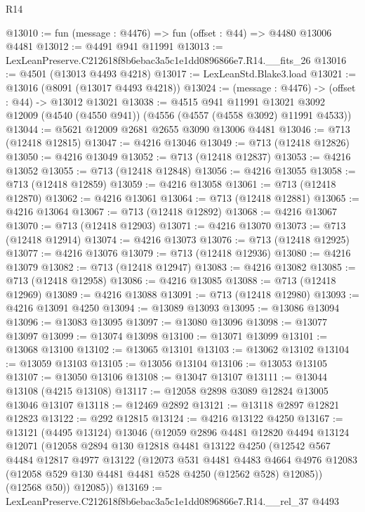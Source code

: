 \begin{lexlean}{R14}
\begin{coremodule}
@13010 := fun (message : @4476) => fun (offset : @44) => @4480 @13006 @4481
@13012 := @4491 @941 @11991
@13013 := LexLeanPreserve.C212618f8b6ebac3a5c1e1dd0896866e7.R14.__fits_26
@13016 := @4501 (@13013 @4493 @4218)
@13017 := LexLeanStd.Blake3.load
@13021 := @13016 (@8091 (@13017 @4493 @4218))
@13024 := (message : @4476) -> (offset : @44) -> @13012 @13021
@13038 := @4515
    @941
    @11991
    @13021
    @3092
    @12009
    (@4540 (@4550 @941))
    (@4556 (@4557 (@4558 @3092) @11991 @4533))
@13044 := @5621 @12009 @2681 @2655 @3090 @13006 @4481
@13046 := @713 (@12418 @12815)
@13047 := @4216 @13046
@13049 := @713 (@12418 @12826)
@13050 := @4216 @13049
@13052 := @713 (@12418 @12837)
@13053 := @4216 @13052
@13055 := @713 (@12418 @12848)
@13056 := @4216 @13055
@13058 := @713 (@12418 @12859)
@13059 := @4216 @13058
@13061 := @713 (@12418 @12870)
@13062 := @4216 @13061
@13064 := @713 (@12418 @12881)
@13065 := @4216 @13064
@13067 := @713 (@12418 @12892)
@13068 := @4216 @13067
@13070 := @713 (@12418 @12903)
@13071 := @4216 @13070
@13073 := @713 (@12418 @12914)
@13074 := @4216 @13073
@13076 := @713 (@12418 @12925)
@13077 := @4216 @13076
@13079 := @713 (@12418 @12936)
@13080 := @4216 @13079
@13082 := @713 (@12418 @12947)
@13083 := @4216 @13082
@13085 := @713 (@12418 @12958)
@13086 := @4216 @13085
@13088 := @713 (@12418 @12969)
@13089 := @4216 @13088
@13091 := @713 (@12418 @12980)
@13093 := @4216 @13091 @4250
@13094 := @13089 @13093
@13095 := @13086 @13094
@13096 := @13083 @13095
@13097 := @13080 @13096
@13098 := @13077 @13097
@13099 := @13074 @13098
@13100 := @13071 @13099
@13101 := @13068 @13100
@13102 := @13065 @13101
@13103 := @13062 @13102
@13104 := @13059 @13103
@13105 := @13056 @13104
@13106 := @13053 @13105
@13107 := @13050 @13106
@13108 := @13047 @13107
@13111 := @13044 @13108 (@4215 @13108)
@13117 := @12058 @2898 @3089 @12824 @13005 @13046 @13107
@13118 := @12469 @2892
@13121 := @13118 @2897 @12821 @12823
@13122 := @292 @12815
@13124 := @4216 @13122 @4250
@13167 := @13121
    (@4495 @13124)
    @13046
    (@12059
      @2896
      @4481
      @12820
      @4494
      @13124
      @12071
      (@12058
        @2894
        @130
        @12818
        @4481
        @13122
        @4250
        (@12542
          @567
          @4484
          @12817
          @4977
          @13122
          (@12073
            @531
            @4481
            @4483
            @4664
            @4976
            @12083
            (@12058 @529 @130 @4481 @4481 @528 @4250 (@12562 @528) @12085))
          (@12568 @50))
        @12085))
@13169 := LexLeanPreserve.C212618f8b6ebac3a5c1e1dd0896866e7.R14.__rel_37 @4493

\end{coremodule}
\end{lexlean}
